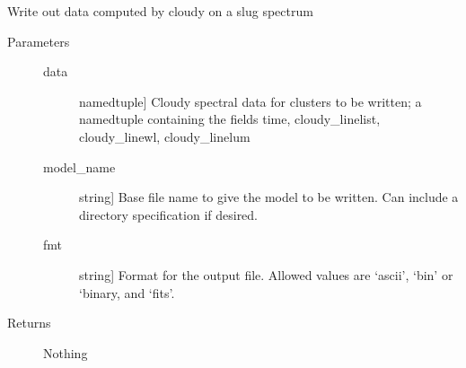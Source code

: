 \documentclass[letterpaper,10pt,english]{sphinxmanual}
\begin{document}
\begin{fulllineitems}
\label{\detokenize{cloudy:slugpy.cloudy.write_cluster_cloudylines}}
Write out data computed by cloudy on a slug spectrum
\begin{description}
\item[{Parameters}] \leavevmode\begin{description}
\item[{data}] \leavevmode{[}namedtuple{]}
Cloudy spectral data for clusters to be written; a namedtuple
containing the fields time, cloudy\_linelist, cloudy\_linewl, 
cloudy\_linelum

\item[{model\_name}] \leavevmode{[}string{]}
Base file name to give the model to be written. Can include a
directory specification if desired.

\item[{fmt}] \leavevmode{[}string{]}
Format for the output file. Allowed values are ‘ascii’, ‘bin’
or ‘binary, and ‘fits’.

\end{description}

\item[{Returns}] \leavevmode
Nothing

\end{description}

\end{fulllineitems}

\end{document}
